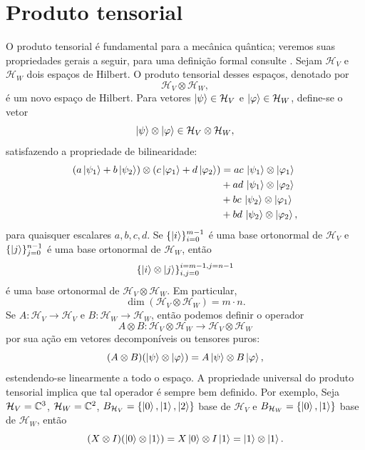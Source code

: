 \section{Produto tensorial}
\label{sec:tensor}

O produto tensorial é fundamental para a mecânica quântica; veremos suas propriedades gerais a seguir, para uma definição formal consulte \cite[capítulo ~14]{Roman2008}. Sejam $\mathcal{H}_V$ e $\mathcal{H}_W$ dois espaços de Hilbert. O produto tensorial desses espaços, denotado por
$$
\mathcal{H}_V \otimes \mathcal{H}_W,
$$
é um novo espaço de Hilbert. Para vetores $\ket{\psi} \in \mathcal{H}_V$ e $\ket{\varphi} \in \mathcal{H}_W$, define-se o vetor
$$
\ket{\psi} \otimes \ket{\varphi} \in \mathcal{H}_V \otimes \mathcal{H}_W,
$$
satisfazendo a propriedade de bilinearidade:
\begin{align*}
(a\ket{\psi_1} + b\ket{\psi_2}) \otimes (c\ket{\varphi_1} + d\ket{\varphi_2}) &= ac\,\ket{\psi_1}\otimes\ket{\varphi_1} \\
&+ ad\,\ket{\psi_1}\otimes\ket{\varphi_2} \\
&+ bc\,\ket{\psi_2}\otimes\ket{\varphi_1} \\
&+ bd\,\ket{\psi_2}\otimes\ket{\varphi_2},
\end{align*}
para quaisquer escalares $a,b,c,d$. Se $\{\ket{i}\}_{i=0}^{m-1}$ é uma base ortonormal de $\mathcal{H}_V$ e $\{\ket{j}\}_{j=0}^{n-1}$ é uma base ortonormal de $\mathcal{H}_W$, então
$$
\{\ket{i} \otimes \ket{j}\}_{i,j=0}^{i=m-1, j=n-1}
$$
é uma base ortonormal de $\mathcal{H}_V \otimes \mathcal{H}_W$. Em particular,
\begin{equation}\label{eq:tensordim}
\dim(\mathcal{H}_V \otimes \mathcal{H}_W) = m \cdot n.	
\end{equation}
Se $A:\mathcal{H}_V \to \mathcal{H}_V$ e $B: \mathcal{H}_W \to \mathcal{H}_W$, então podemos definir o operador
$$
A \otimes B: \mathcal{H}_V\otimes \mathcal{H}_W \to \mathcal{H}_V \otimes \mathcal{H}_W
$$
por sua ação em vetores decomponíveis ou tensores puros:
$$
(A \otimes B)(\ket{\psi} \otimes \ket{\varphi})
=
A\ket{\psi} \otimes B\ket{\varphi},
$$
estendendo-se linearmente a todo o espaço. A propriedade universal do produto tensorial implica que tal operador é sempre bem definido. Por exemplo, Seja $\mathcal{H}_V=\mathbb{C}^3$, $\mathcal{H}_W=\mathbb{C}^2$, $B_{\mathcal{H}_V}=\{\ket{0}, \ket{1}, \ket{2}\}$ base de $\mathcal{H}_V$ e $B_{\mathcal{H}_W}=\{\ket{0}, \ket{1}\}$ base de $\mathcal{H}_W$, então
\begin{equation}\label{eq:kronecker}
(X \otimes I)(\ket{0}\otimes\ket{1})
=
X\ket{0} \otimes I\ket{1}
=
\ket{1}\otimes\ket{1}.
\end{equation}
